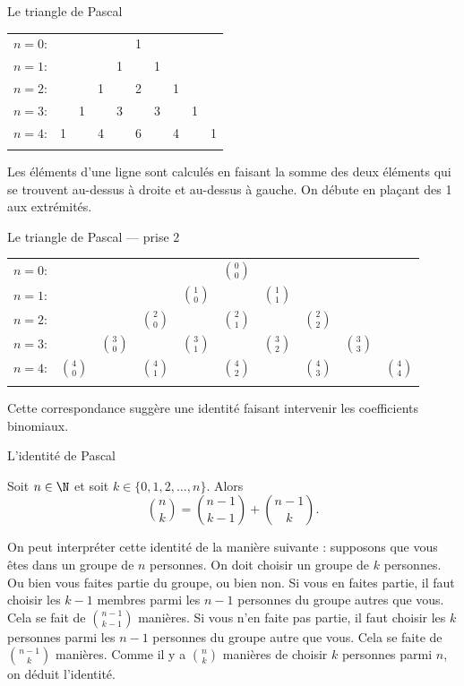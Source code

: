 \documentclass[nuit,charter,pied]{BeamerJS}
\begin{document}
\begin{frame}{Le triangle de Pascal}
	\begin{center}
	\begin{tabular}{rccccccccc}
		$n=0$:&    &    &    &    &  1\\\noalign{\smallskip\smallskip}
		$n=1$:&    &    &    &  1 &    &  1\\\noalign{\smallskip\smallskip}
		$n=2$:&    &    &  1 &    &  2 &    &  1\\\noalign{\smallskip\smallskip}
		$n=3$:&    &  1 &    &  3 &    &  3 &    &  1\\\noalign{\smallskip\smallskip}
		$n=4$:&  1 &    &  4 &    &  6 &    &  4 &    &  1\\\noalign{\smallskip\smallskip}
	\end{tabular}
	\end{center}
	Les éléments d'une ligne sont calculés en faisant la somme des deux éléments qui se trouvent au-dessus à droite et au-dessus à gauche. On débute en plaçant des 1 aux extrémités.
\end{frame}
\begin{frame}{Le triangle de Pascal --- prise 2}
	\begin{center}
		\begin{tabular}{rccccccccc}
			$n=0$:&    &    &    &    &  $\binom{0}{0}$\\\noalign{\smallskip\smallskip}
			$n=1$:&    &    &    &  $\binom{1}{0}$ &    & $\binom{1}{1}$\\\noalign{\smallskip\smallskip}
			$n=2$:&    &    &  $\binom{2}{0}$ &    &  $\binom{2}{1}$ &    &  $\binom{2}{2}$\\\noalign{\smallskip\smallskip}
			$n=3$:&    &  $\binom{3}{0}$ &    &  $\binom{3}{1}$ &    &  $\binom{3}{2}$ &    &  $\binom{3}{3}$\\\noalign{\smallskip\smallskip}
			$n=4$:&  $\binom{4}{0}$ &    &  $\binom{4}{1}$ &    &  $\binom{4}{2}$ &    &  $\binom{4}{3}$ &    &  $\binom{4}{4}$\\\noalign{\smallskip\smallskip}
		\end{tabular}
	\end{center}
	Cette correspondance suggère une identité faisant intervenir les coefficients binomiaux.
\end{frame}
\begin{frame}{L'identité de Pascal}
	\begin{thm}{}{}
		Soit \(n\in\N\) et soit \(k\in\{0,1,2,\ldots,n\}\). Alors
		\[\binom{n}{k}=\binom{n-1}{k-1}+\binom{n-1}{k}.\]
	\end{thm}
	\pause
	On peut interpréter cette identité de la manière suivante : supposons que vous êtes dans un groupe de \(n\) personnes. On doit choisir un groupe de \(k\) personnes. Ou bien vous faites partie du groupe, ou bien non. Si vous en faites partie, il faut choisir les \(k-1\) membres parmi les \(n-1\) personnes du groupe autres que vous. Cela se fait de \(\binom{n-1}{k-1}\) manières. Si vous n'en faite pas partie, il faut choisir les \(k\) personnes parmi les \(n-1\) personnes du groupe autre que vous. Cela se faite de \(\binom{n-1}{k}\) manières. Comme il y a \(\binom{n}{k}\) manières de choisir \(k\) personnes parmi \(n\), on déduit l'identité.
\end{frame}
\end{document}
